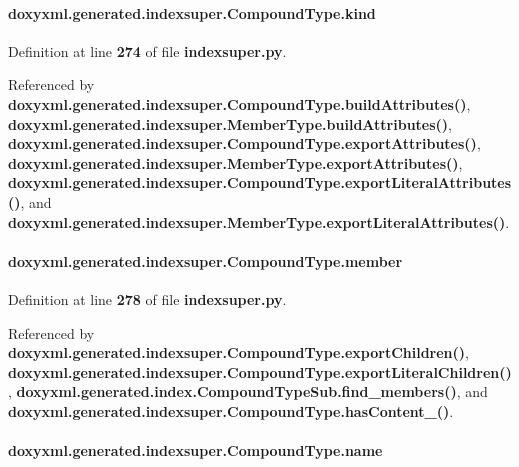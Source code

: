 \paragraph[{kind}]{\setlength{\rightskip}{0pt plus 5cm}doxyxml.\+generated.\+indexsuper.\+Compound\+Type.\+kind}\label{classdoxyxml_1_1generated_1_1indexsuper_1_1CompoundType_a686a08f2b4b5e31df51fed6e158f5e0c}


Definition at line {\bf 274} of file {\bf indexsuper.\+py}.



Referenced by {\bf doxyxml.\+generated.\+indexsuper.\+Compound\+Type.\+build\+Attributes()}, {\bf doxyxml.\+generated.\+indexsuper.\+Member\+Type.\+build\+Attributes()}, {\bf doxyxml.\+generated.\+indexsuper.\+Compound\+Type.\+export\+Attributes()}, {\bf doxyxml.\+generated.\+indexsuper.\+Member\+Type.\+export\+Attributes()}, {\bf doxyxml.\+generated.\+indexsuper.\+Compound\+Type.\+export\+Literal\+Attributes()}, and {\bf doxyxml.\+generated.\+indexsuper.\+Member\+Type.\+export\+Literal\+Attributes()}.

\paragraph[{member}]{\setlength{\rightskip}{0pt plus 5cm}doxyxml.\+generated.\+indexsuper.\+Compound\+Type.\+member}\label{classdoxyxml_1_1generated_1_1indexsuper_1_1CompoundType_ae367456142f1e02ad0200bccd077638b}


Definition at line {\bf 278} of file {\bf indexsuper.\+py}.



Referenced by {\bf doxyxml.\+generated.\+indexsuper.\+Compound\+Type.\+export\+Children()}, {\bf doxyxml.\+generated.\+indexsuper.\+Compound\+Type.\+export\+Literal\+Children()}, {\bf doxyxml.\+generated.\+index.\+Compound\+Type\+Sub.\+find\+\_\+members()}, and {\bf doxyxml.\+generated.\+indexsuper.\+Compound\+Type.\+has\+Content\+\_\+()}.

\paragraph[{name}]{\setlength{\rightskip}{0pt plus 5cm}doxyxml.\+generated.\+indexsuper.\+Compound\+Type.\+name}\label{classdoxyxml_1_1generated_1_1indexsuper_1_1CompoundType_adf9d31895158633e4b970ec43bfe580c}


